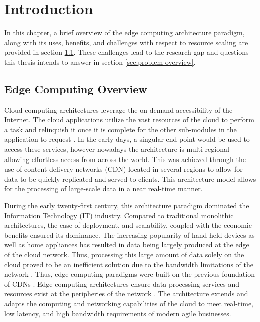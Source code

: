 \clearpage

\def\chaptertitle{Introduction}

\lhead{\emph{\chaptertitle}}

\chapter{\chaptertitle}
\label{ch:introduction}

In this chapter, a brief overview of the edge computing architecture paradigm, along with its uses, benefits, and challenges with respect to resource scaling are provided in section \ref{sec:edge-arch}. These challenges lead to the research gap and questions this thesis intends to answer in section \ref{sec:problem-overview}.\par

\section{Edge Computing Overview}
\label{sec:edge-arch}

Cloud computing architectures leverage the on-demand accessibility of the Internet. The cloud applications utilize the vast resources of the cloud to perform a task and relinquish it once it is complete for the other sub-modules in the application to request \cite{rimal2009taxonomy}. In the early days, a singular end-point would be used to access these services, however nowadays the architecture is multi-regional allowing effortless access from across the world. This was achieved through the use of content delivery networks (CDN) located in several regions to allow for data to be quickly replicated and served to clients. This architecture model allows for the processing of large-scale data in a near real-time manner.\par

During the early twenty-first century, this architecture paradigm dominated the Information Technology (IT) industry. Compared to traditional monolithic architectures, the ease of deployment, and scalability, coupled with the economic benefits ensured its dominance. The increasing popularity of hand-held devices as well as home appliances has resulted in data being largely produced at the edge of the cloud network. Thus, processing this large amount of data solely on the cloud proved to be an inefficient solution due to the bandwidth limitations of the network \cite{shi2016edge}. Thus, edge computing paradigms were built on the previous foundation of CDNs \cite{satyanarayanan2017emergence}. Edge computing architectures ensure data processing services and resources exist at the peripheries of the network \cite{cao2020overview}. The architecture extends and adapts the computing and networking capabilities of the cloud to meet real-time, low latency, and high bandwidth requirements of modern agile businesses.\par

